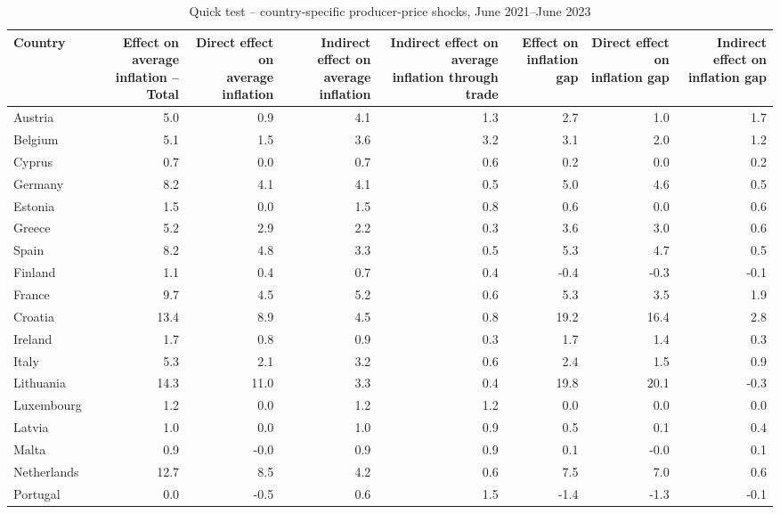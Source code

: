 \begin{table}[H]
\centering
\caption{Quick test -- country-specific producer-price shocks, June 2021--June 2023}
\scriptsize
\setlength{\tabcolsep}{1.2pt}
\begin{tabular}{lrrrrrrr}
\toprule
Country & \shortstack{Effect on average\\inflation -- Total} & \shortstack{Direct effect on\\average inflation} & \shortstack{Indirect effect on\\average inflation} & \shortstack{Indirect effect on average\\inflation through trade} & \shortstack{Effect on\\inflation gap} & \shortstack{Direct effect on\\inflation gap} & \shortstack{Indirect effect on\\inflation gap}
 \\
\midrule
Austria & 5.0 & 0.9 & 4.1 & 1.3 & 2.7 & 1.0 & 1.7
 \\
Belgium & 5.1 & 1.5 & 3.6 & 3.2 & 3.1 & 2.0 & 1.2
 \\
Cyprus & 0.7 & 0.0 & 0.7 & 0.6 & 0.2 & 0.0 & 0.2
 \\
Germany & 8.2 & 4.1 & 4.1 & 0.5 & 5.0 & 4.6 & 0.5
 \\
Estonia & 1.5 & 0.0 & 1.5 & 0.8 & 0.6 & 0.0 & 0.6
 \\
Greece & 5.2 & 2.9 & 2.2 & 0.3 & 3.6 & 3.0 & 0.6
 \\
Spain & 8.2 & 4.8 & 3.3 & 0.5 & 5.3 & 4.7 & 0.5
 \\
Finland & 1.1 & 0.4 & 0.7 & 0.4 & -0.4 & -0.3 & -0.1
 \\
France & 9.7 & 4.5 & 5.2 & 0.6 & 5.3 & 3.5 & 1.9
 \\
Croatia & 13.4 & 8.9 & 4.5 & 0.8 & 19.2 & 16.4 & 2.8
 \\
Ireland & 1.7 & 0.8 & 0.9 & 0.3 & 1.7 & 1.4 & 0.3
 \\
Italy & 5.3 & 2.1 & 3.2 & 0.6 & 2.4 & 1.5 & 0.9
 \\
Lithuania & 14.3 & 11.0 & 3.3 & 0.4 & 19.8 & 20.1 & -0.3
 \\
Luxembourg & 1.2 & 0.0 & 1.2 & 1.2 & 0.0 & 0.0 & 0.0
 \\
Latvia & 1.0 & 0.0 & 1.0 & 0.9 & 0.5 & 0.1 & 0.4
 \\
Malta & 0.9 & -0.0 & 0.9 & 0.9 & 0.1 & -0.0 & 0.1
 \\
Netherlands & 12.7 & 8.5 & 4.2 & 0.6 & 7.5 & 7.0 & 0.6
 \\
Portugal & 0.0 & -0.5 & 0.6 & 1.5 & -1.4 & -1.3 & -0.1

\end{tabular}
\end{table}
